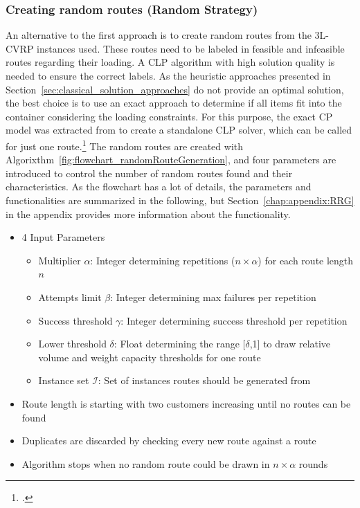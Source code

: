 \subsubsection{Creating random routes (Random Strategy)}
An alternative to the first approach is to create random routes from the \gls{3L-CVRP} instances used.
These routes need to be labeled in feasible and infeasible routes regarding their loading.
A \gls{CLP} algorithm with high solution quality is needed to ensure the correct labels. As the heuristic approaches
presented in Section~\ref{sec:classical_solution_approaches} do not provide an optimal solution,
the best choice is to use an exact approach to determine if all items fit into the container considering the loading constraints.
For this purpose, the exact \gls{CP} model was extracted from \cite{tamke_repository_2024} to create
a standalone \gls{CLP} solver, which can be called for just one route.\footcite[Stolen with permission from][]{tamke_repository_2024}
The random routes are created with Algorixthm~\ref{fig:flowchart_randomRouteGeneration}, and four parameters are introduced to
control the number of random routes found and their characteristics. As the flowchart has a lot of details, the parameters and
functionalities are summarized in the following, but Section~\ref{chap:appendix:RRG} in the appendix provides more information about
the functionality.

\begin{itemize}
    \item 4 Input Parameters
          \begin{itemize}
              \item Multiplier $\alpha$: Integer determining repetitions ($n\times\alpha$) for each route length $n$
              \item  Attempts limit $\beta$: Integer determining max failures per repetition
              \item  Success threshold $\gamma$: Integer determining success threshold per repetition
              \item  Lower threshold $\delta$: Float determining the range [$\delta$,1] to draw relative volume and weight capacity thresholds for one route
              \item Instance set $\mathcal{I}$: Set of instances routes should be generated from
          \end{itemize}
    \item Route length is starting with two customers increasing until no routes can be found
    \item Duplicates are discarded by checking every new route against a route
    \item Algorithm stops when no random route could be drawn in $n \times \alpha$ rounds
\end{itemize}


